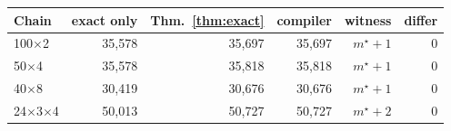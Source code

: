 \begin{tabular}{lrrrrr}
\toprule
Chain & exact only & Thm.~\ref{thm:exact} & compiler & witness & differ\\
\midrule
100$\times$2 & 35,578 & 35,697 & 35,697 & $m^\star{+}1$ & 0\\
50$\times$4 & 35,578 & 35,818 & 35,818 & $m^\star{+}1$ & 0\\
40$\times$8 & 30,419 & 30,676 & 30,676 & $m^\star{+}1$ & 0\\
24$\times$3$\times$4 & 50,013 & 50,727 & 50,727 & $m^\star{+}2$ & 0\\
\bottomrule
\end{tabular}
